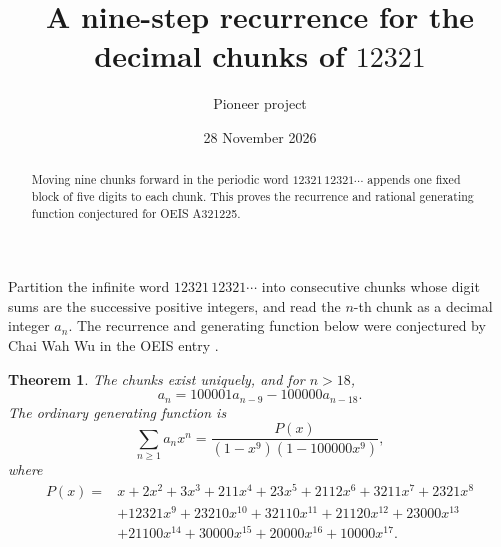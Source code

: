 \documentclass[11pt]{article}
\title{A nine-step recurrence for the decimal chunks of \(12321\)}
\author{Pioneer project}
\date{28 November 2026}
\newtheorem{theorem}{Theorem}
\begin{document}
\maketitle

\begin{abstract}
Moving nine chunks forward in the periodic word \(12321\,12321\cdots\) appends one fixed block of five digits to each chunk. This proves the recurrence and rational generating function conjectured for OEIS A321225.
\end{abstract}

Partition the infinite word \(12321\,12321\cdots\) into consecutive chunks whose digit sums are the successive positive integers, and read the \(n\)-th chunk as a decimal integer \(a_n\). The recurrence and generating function below were conjectured by Chai Wah Wu in the OEIS entry \cite{oeis}.

\begin{theorem}
The chunks exist uniquely, and for \(n>18\),
\[
a_n=100001a_{n-9}-100000a_{n-18}.
\]
The ordinary generating function is
\[
\sum_{n\ge1}a_nx^n
=\frac{P(x)}{(1-x^9)(1-100000x^9)},
\]
where
\begin{align*}
P(x)={}&x+2x^2+3x^3+211x^4+23x^5+2112x^6+3211x^7+2321x^8\\
&+12321x^9+23210x^{10}+32110x^{11}+21120x^{12}+23000x^{13}\\
&+21100x^{14}+30000x^{15}+20000x^{16}+10000x^{17}.
\end{align*}
\end{theorem}
\end{document}
